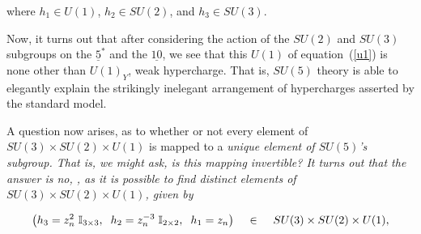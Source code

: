 \documentclass[letterpaper,12pt,titlepage,oneside,final]{book}
\begin{document}
\noindent where $h_1\in U(1)$, $h_2\in SU(2)$, and $h_3\in SU(3)$.

Now, it turns out that after considering the action of the $SU(2)$ and $SU(3)$ subgroups on the $\underline{5}^*$ and the $\underline{10}$, we see that this $U(1)$ of equation~(\ref{u1}) is none other than $U(1)_Y$, weak hypercharge.  That is, $SU(5)$ theory is able to elegantly explain the strikingly inelegant arrangement of hypercharges asserted by the standard model.

\medskip

A question now arises, as to whether or not every element of $SU(3)\times SU(2) \times U(1)$ is mapped to a \it unique \rm element of $SU(5)$'s subgroup.  That is, we might ask, is this mapping invertible?  It turns out that the answer is no, \cite{agut}, as it is possible to find distinct elements of $SU(3)\times SU(2) \times U(1)$, given by



\begin{equation}\left(h_3 = z_n^{2}\hspace{1mm}\mathbb{I}_{3\times3}, \hspace{2mm} h_2 = z_n^{-3}\hspace{1mm}\mathbb{I}_{2\times2}, \hspace{2mm}h_1 = z_n   \right)  \hspace{4mm}\in\hspace{4mm}SU(3)\times SU(2) \times U(1),
\end{equation}





\end{document}
